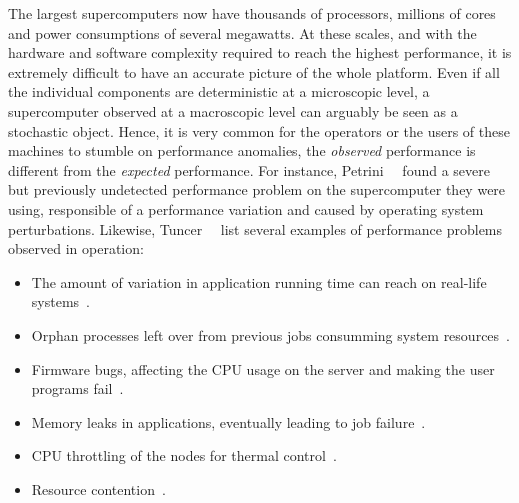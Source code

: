         The largest supercomputers now have thousands of processors, millions of cores and power consumptions of several
        megawatts. At these scales, and with the hardware and software complexity required to reach the highest
        performance, it is extremely difficult to have an accurate picture of the whole platform. Even if all the
        individual components are deterministic at a microscopic level, a supercomputer observed at a macroscopic level
        can arguably be seen as a stochastic object. Hence, it is very common for the operators or the users of these
        machines to stumble on performance anomalies, \ie the \emph{observed} performance is different from the
        \emph{expected} performance. For instance, Petrini~\etal~\cite{Petrini_2003} found a severe but previously
        undetected performance problem on the supercomputer they were using, responsible of a 
        performance variation and caused by operating system perturbations. Likewise,
        Tuncer~\etal~\cite[Section~1]{Tuncer_2017} list several examples of performance problems observed in operation:
        \begin{itemize}
            \item The amount of variation in application running time can reach  on real-life
                systems~\cite{Bhatele_2013,Skinner}.
            \item Orphan processes left over from previous jobs consumming system resources~\cite{Brandt_2010}.
            \item Firmware bugs, affecting the CPU usage on the server and making the user programs
                fail~\cite{cisco_bug}.
            \item Memory leaks in applications, eventually leading to job failure~\cite{Agelastos_2015}.
            \item CPU throttling of the nodes for thermal control~\cite{Brandt2015EnablingAO}.
            \item Resource contention~\cite{Bhatele_2013,dorier:hal-00916091}.
        \end{itemize}


